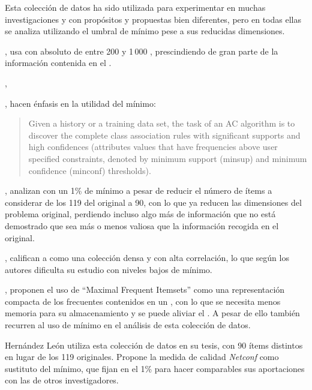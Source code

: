 \ABIERTO
Esta colección de datos ha sido utilizada para experimentar en muchas investigaciones y con propósitos y propuestas bien diferentes, pero en todas ellas se analiza utilizando el umbral de \soporte mínimo pese a sus reducidas dimensiones.

\cite{Borgelt-EfficientImplementationsOfAprioriAndEclat-2004}, usa \mushroom con \soporte absoluto de entre 200 y 1\,000 \transacciones, prescindiendo de gran parte de la información contenida en el \dataset.

\cite{Suzuki-DiscoveringInterestingExceptionRulesWithRulePair-2004}, 

\cite{ThabtahCowlingHammoud-ImprovingRuleSorting-2006}, hacen énfasis en la utilidad del \soporte mínimo:
\begin{quote}
Given a history or a training data set, the task of an AC algorithm is to discover the complete class association rules with significant supports and high confidences (attributes values that have frequencies above user specified constraints, denoted by minimum support (minsup) and minimum confidence (minconf) thresholds).
\end{quote}

\cite{WangXinCoenen-MiningEfficientlySignificantCAR-2008}, analizan \mushroom con un 1\% de \soporte mínimo a pesar de reducir el número de ítems a considerar de los 119 del \dataset original a 90, con lo que ya reducen las dimensiones del problema original, perdiendo incluso algo más de información que no está demostrado que sea más o menos valiosa que la información recogida en el \dataset original.


\cite{LiChen-MiningNonDerivableFIOverDataStream-2009}, califican a \mushroom como una colección densa y con alta correlación, lo que según los autores dificulta su estudio con niveles bajos de \soporte mínimo.

\cite{LiZhang-MiningMaximalFIOnGraphicsProcessors-2010}, proponen el uso de "`Maximal Frequent Itemsets"' como una representación compacta de los \itemsets frecuentes contenidos en un \dataset, con lo que se necesita menos memoria para su almacenamiento y se puede aliviar el \dilemaIR. A pesar de ello también recurren al uso de \soporte mínimo en el análisis de esta colección de datos.

Hernández León utiliza esta colección de datos en su tesis, con 90 ítems distintos en lugar de los 119 originales. Propone la medida de calidad \emph{Netconf} como sustituto del \soporte mínimo, que fijan en el 1\% para hacer comparables sus aportaciones con las de otros investigadores.

